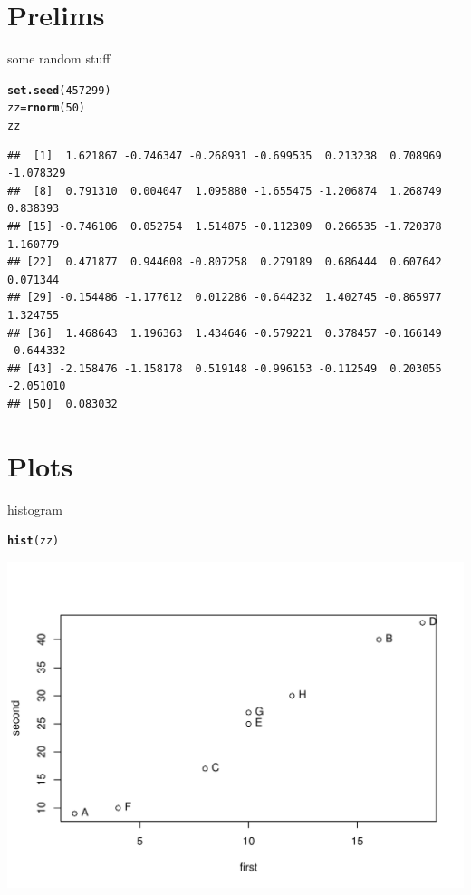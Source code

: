 \documentclass{article}\usepackage[]{graphicx}\usepackage[]{color}
\makeatletter
\def\maxwidth{ %
  \ifdim\Gin@nat@width>\linewidth
    \linewidth
  \else
    \Gin@nat@width
  \fi
}
\newcommand{\hlnum}[1]{\textcolor[rgb]{0.686,0.059,0.569}{#1}}%
\newcommand{\hlstd}[1]{\textcolor[rgb]{0.345,0.345,0.345}{#1}}%
\newcommand{\hlkwb}[1]{\textcolor[rgb]{0.69,0.353,0.396}{#1}}%
\newcommand{\hlkwd}[1]{\textcolor[rgb]{0.737,0.353,0.396}{\textbf{#1}}}%
\newenvironment{kframe}{%
 \def\at@end@of@kframe{}%
 \ifinner\ifhmode%
  \def\at@end@of@kframe{\end{minipage}}%
  \begin{minipage}{\columnwidth}%
 \fi\fi%
 \def\FrameCommand##1{\hskip\@totalleftmargin \hskip-\fboxsep
 \colorbox{shadecolor}{##1}\hskip-\fboxsep
     \hskip-\linewidth \hskip-\@totalleftmargin \hskip\columnwidth}%
 \MakeFramed {\advance\hsize-\width
   \@totalleftmargin\z@ \linewidth\hsize
   \@setminipage}}%
 {\par\unskip\endMakeFramed%
 \at@end@of@kframe}
\newenvironment{knitrout}{}{} %
\makeatother
\begin{document}
\section{Prelims}

some random stuff

\begin{knitrout}
\color{fgcolor}\begin{kframe}
\begin{alltt}
\hlkwd{set.seed}\hlstd{(}\hlnum{457299}\hlstd{)}
\hlstd{zz} \hlkwb{=} \hlkwd{rnorm}\hlstd{(}\hlnum{50}\hlstd{)}
\hlstd{zz}
\end{alltt}
\begin{verbatim}
##  [1]  1.621867 -0.746347 -0.268931 -0.699535  0.213238  0.708969 -1.078329
##  [8]  0.791310  0.004047  1.095880 -1.655475 -1.206874  1.268749  0.838393
## [15] -0.746106  0.052754  1.514875 -0.112309  0.266535 -1.720378  1.160779
## [22]  0.471877  0.944608 -0.807258  0.279189  0.686444  0.607642  0.071344
## [29] -0.154486 -1.177612  0.012286 -0.644232  1.402745 -0.865977  1.324755
## [36]  1.468643  1.196363  1.434646 -0.579221  0.378457 -0.166149 -0.644332
## [43] -2.158476 -1.158178  0.519148 -0.996153 -0.112549  0.203055 -2.051010
## [50]  0.083032
\end{verbatim}
\end{kframe}
\end{knitrout}


\section{Plots}

histogram

\begin{knitrout}
\color{fgcolor}\begin{kframe}
\begin{alltt}
\hlkwd{hist}\hlstd{(zz)}
\end{alltt}
\end{kframe}
\includegraphics[width=\maxwidth]{figure/unnamed-chunk-2} 

\end{knitrout}
\end{document}
